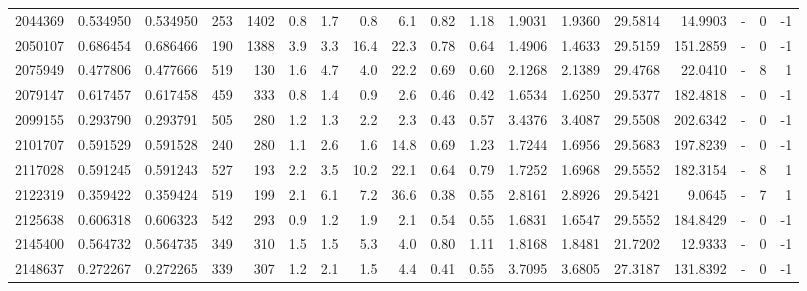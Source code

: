 \begin{tabular}{rrrrrrrrrrrrrrrlrr}
   2044369 & 0.534950 &   0.534950 &  253 & 1402 &      0.8 &      1.7 &     0.8 &      6.1 &       0.82 &        1.18 &  1.9031 &  1.9360 &   29.5814 &   14.9903 &             - &        0 &         -1 \\
   2050107 & 0.686454 &   0.686466 &  190 & 1388 &      3.9 &      3.3 &    16.4 &     22.3 &       0.78 &        0.64 &  1.4906 &  1.4633 &   29.5159 &  151.2859 &             - &        0 &         -1 \\
   2075949 & 0.477806 &   0.477666 &  519 &  130 &      1.6 &      4.7 &     4.0 &     22.2 &       0.69 &        0.60 &  2.1268 &  2.1389 &   29.4768 &   22.0410 &             - &        8 &          1 \\
   2079147 & 0.617457 &   0.617458 &  459 &  333 &      0.8 &      1.4 &     0.9 &      2.6 &       0.46 &        0.42 &  1.6534 &  1.6250 &   29.5377 &  182.4818 &             - &        0 &         -1 \\
   2099155 & 0.293790 &   0.293791 &  505 &  280 &      1.2 &      1.3 &     2.2 &      2.3 &       0.43 &        0.57 &  3.4376 &  3.4087 &   29.5508 &  202.6342 &             - &        0 &         -1 \\
   2101707 & 0.591529 &   0.591528 &  240 &  280 &      1.1 &      2.6 &     1.6 &     14.8 &       0.69 &        1.23 &  1.7244 &  1.6956 &   29.5683 &  197.8239 &             - &        0 &         -1 \\
   2117028 & 0.591245 &   0.591243 &  527 &  193 &      2.2 &      3.5 &    10.2 &     22.1 &       0.64 &        0.79 &  1.7252 &  1.6968 &   29.5552 &  182.3154 &             - &        8 &          1 \\
   2122319 & 0.359422 &   0.359424 &  519 &  199 &      2.1 &      6.1 &     7.2 &     36.6 &       0.38 &        0.55 &  2.8161 &  2.8926 &   29.5421 &    9.0645 &             - &        7 &          1 \\
   2125638 & 0.606318 &   0.606323 &  542 &  293 &      0.9 &      1.2 &     1.9 &      2.1 &       0.54 &        0.55 &  1.6831 &  1.6547 &   29.5552 &  184.8429 &             - &        0 &         -1 \\
   2145400 & 0.564732 &   0.564735 &  349 &  310 &      1.5 &      1.5 &     5.3 &      4.0 &       0.80 &        1.11 &  1.8168 &  1.8481 &   21.7202 &   12.9333 &             - &        0 &         -1 \\
   2148637 & 0.272267 &   0.272265 &  339 &  307 &      1.2 &      2.1 &     1.5 &      4.4 &       0.41 &        0.55 &  3.7095 &  3.6805 &   27.3187 &  131.8392 &             - &        0 &         -1 \\

\end{tabular}
